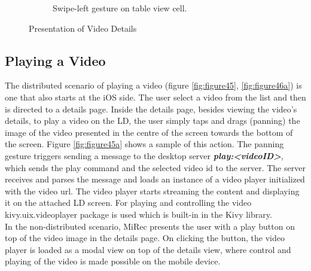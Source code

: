 \begin{figure}[!htpb]
\begin{subfigure}[b]{0.3\textwidth}
        \caption{Swipe-left gesture on table view cell.}
        \label{fig:figure44b}
    \end{subfigure}
   \caption{Presentation of Video Details}\label{fig:figure44}
\end{figure}
\subsection{Playing a Video}
The distributed scenario of playing a video (figure \ref{fig:figure45},
\ref{fig:figure46a}) is one that also starts at the iOS side. The user select a
video from the list and then is directed to a details page. Inside the details
page, besides viewing the video's details, to play a video on the LD, the user
simply taps and drags (panning) the image of the video presented in the centre
of the screen towards the bottom of the screen. Figure \ref{fig:figure45a} shows a sample
of this action. The panning gesture triggers sending a message to the desktop
server \textbf{\textit{play:<videoID>}}, which sends the play command and the selected video id to the server. The server receives and parses the message and loads an instance of a video player initialized with the video url. The video player starts streaming the content and displaying it on the attached LD screen. For playing and controlling the video kivy.uix.videoplayer package is used which is built-in in the Kivy library.\\
In the non-distributed scenario, MiRec presents the user with a play button on
top of the video image in the details page. On clicking the button, the video player is loaded as a modal view on top of the details view, where control and playing of the video is made possible on the mobile device.

